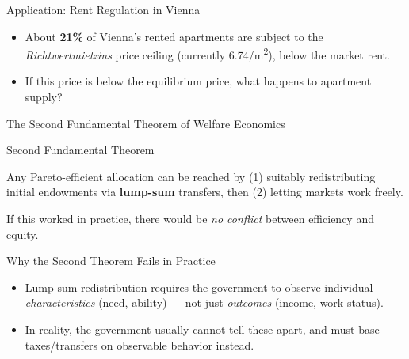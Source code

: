 \documentclass[11pt,aspectratio=169]{beamer}
\begin{document}
\begin{frame}{Application: Rent Regulation in Vienna}
  
  \begin{itemize}
    \item About \textbf{21\%} of Vienna's rented apartments are subject to the \emph{Richtwertmietzins} price ceiling (currently \texteuro{}6.74/m\textsuperscript{2}), below the market rent.
    \item If this price is below the equilibrium price, what happens to apartment supply?
  \end{itemize}

 
\end{frame}

\begin{frame}{The Second Fundamental Theorem of Welfare Economics}

  \begin{alertblock}{Second Fundamental Theorem}
    \end{alertblock}
    Any Pareto-efficient allocation can be reached by (1) suitably redistributing initial endowments via \textbf{lump-sum} transfers, then (2) letting markets work freely.


  If this worked in practice, there would be \emph{no conflict} between efficiency and equity.
\end{frame}

\begin{frame}{Why the Second Theorem Fails in Practice}
  \begin{itemize}
    \item Lump-sum redistribution requires the government to observe individual \emph{characteristics} (need, ability) --- not just \emph{outcomes} (income, work status).
    \item In reality, the government usually cannot tell these apart, and must base taxes/transfers on observable behavior instead.
  \end{itemize}
 
\end{frame}
\end{document}
